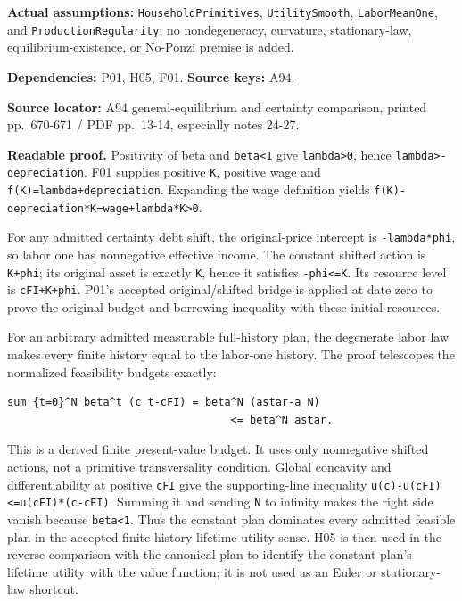 \documentclass[
  11pt,
]{article}
\let\LedgerOriginalTexttt\texttt
\renewcommand{\texttt}[1]{{\small\LedgerOriginalTexttt{#1}}}
\begin{document}
\textbf{Actual assumptions:} \texttt{HouseholdPrimitives},
\texttt{UtilitySmooth}, \texttt{LaborMeanOne}, and
\texttt{ProductionRegularity}; no nondegeneracy, curvature,
stationary-law, equilibrium-existence, or No-Ponzi premise is added.

\textbf{Dependencies:} P01, H05, F01. \textbf{Source keys:} A94.

\textbf{Source locator:} A94 general-equilibrium and certainty
comparison, printed pp.~670-671 / PDF pp.~13-14, especially notes 24-27.

\textbf{Readable proof.} Positivity of beta and
\texttt{beta\textless{}1} give \texttt{lambda\textgreater{}0}, hence
\texttt{lambda\textgreater{}-depreciation}. F01 supplies positive
\texttt{K}, positive wage and
\texttt{f\textquotesingle{}(K)=lambda+depreciation}. Expanding the wage
definition yields
\texttt{f(K)-depreciation*K=wage+lambda*K\textgreater{}0}.

For any admitted certainty debt shift, the original-price intercept is
\texttt{-lambda*phi}, so labor one has nonnegative effective income. The
constant shifted action is \texttt{K+phi}; its original asset is exactly
\texttt{K}, hence it satisfies \texttt{-phi\textless{}=K}. Its resource
level is \texttt{cFI+K+phi}. P01's accepted original/shifted bridge is
applied at date zero to prove the original budget and borrowing
inequality with these initial resources.

For an arbitrary admitted measurable full-history plan, the degenerate
labor law makes every finite history equal to the labor-one history. The
proof telescopes the normalized feasibility budgets exactly:

\begin{verbatim}
sum_{t=0}^N beta^t (c_t-cFI) = beta^N (astar-a_N)
                                   <= beta^N astar.
\end{verbatim}

This is a derived finite present-value budget. It uses only nonnegative
shifted actions, not a primitive transversality condition. Global
concavity and differentiability at positive \texttt{cFI} give the
supporting-line inequality
\texttt{u(c)-u(cFI)\textless{}=u\textquotesingle{}(cFI)*(c-cFI)}.
Summing it and sending \texttt{N} to infinity makes the right side
vanish because \texttt{beta\textless{}1}. Thus the constant plan
dominates every admitted feasible plan in the accepted finite-history
lifetime-utility sense. H05 is then used in the reverse comparison with
the canonical plan to identify the constant plan's lifetime utility with
the value function; it is not used as an Euler or stationary-law
shortcut.
\end{document}
